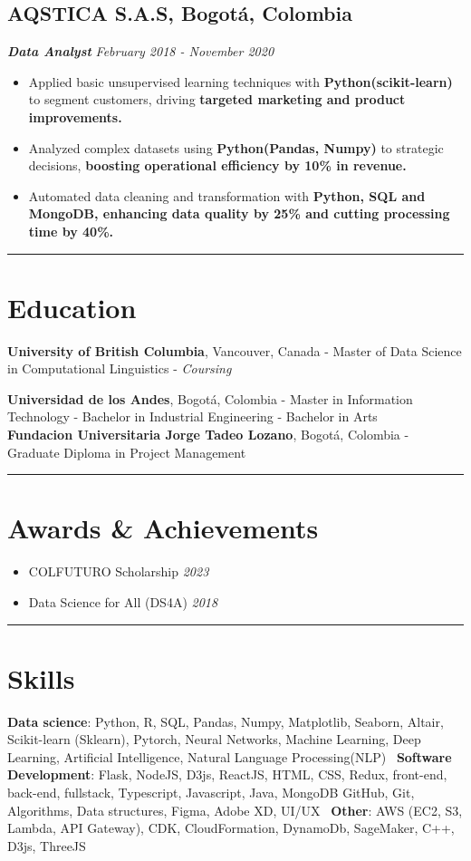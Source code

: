 \documentclass[10pt,a4paper]{article}
\begin{document}
\subsection*{AQSTICA S.A.S, Bogotá, Colombia}
{\fontsize{11}{12} \textbf{\textit{Data Analyst}}} \hfill \textit{February 2018 - November 2020}
\begin{itemize}[noitemsep]
    \item Applied basic unsupervised learning techniques with \textbf{Python(scikit-learn)} to segment customers, driving \textbf{targeted marketing and product improvements.}
    \item Analyzed complex datasets using \textbf{Python(Pandas, Numpy)} to strategic decisions, \textbf{boosting operational efficiency by 10\% in revenue.}
    \item Automated data cleaning and transformation with \textbf{Python, SQL and MongoDB, enhancing data quality by 25\% and cutting processing time by 40\%.}
\end{itemize}
\rule{\textwidth}{0.4pt} 
\section*{Education}

\textbf{University of British Columbia}, Vancouver, Canada - Master of Data Science in Computational Linguistics - \textit{Coursing}

\textbf{Universidad de los Andes}, Bogotá, Colombia - Master in Information Technology - Bachelor in Industrial Engineering - Bachelor in Arts \\
\textbf{Fundacion Universitaria Jorge Tadeo Lozano}, Bogotá, Colombia - Graduate Diploma in Project Management\\
\rule{\textwidth}{0.4pt} 

\section*{Awards \& Achievements}

\begin{itemize}[noitemsep]
    \item COLFUTURO Scholarship \hfill \textit{2023}
    \item Data Science for All (DS4A)  \hfill \textit{2018}
\end{itemize}

\rule{\textwidth}{0.4pt} 

\section*{Skills}
\textbf{Data science}: Python, R, SQL, Pandas, Numpy, Matplotlib, Seaborn, Altair, Scikit-learn (Sklearn), Pytorch, Neural Networks, Machine Learning, Deep Learning, Artificial Intelligence, Natural Language Processing(NLP)
\textbar\ \textbf{Software Development}: Flask, NodeJS, D3js, ReactJS, HTML, CSS, Redux, front-end, back-end, fullstack, Typescript, Javascript, Java, MongoDB
GitHub, Git, Algorithms, Data structures, Figma, Adobe XD, UI/UX
\textbar\ \textbf{Other}:  AWS (EC2, S3, Lambda, API Gateway), CDK, CloudFormation, DynamoDb, SageMaker, C++, D3js, ThreeJS
\end{document}
